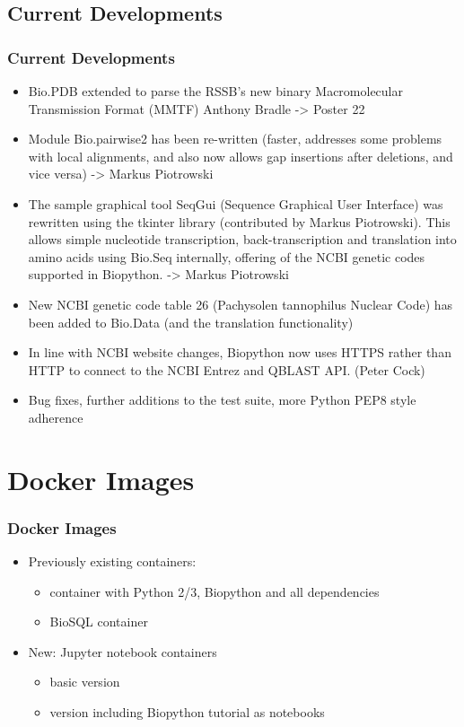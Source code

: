 \documentclass[trans]{beamer}
\begin{document}
\subsection*{Current Developments}
\frame
{
  \frametitle{Current Developments}

  \begin{itemize}
  \item Bio.PDB extended to parse the RSSB's new binary Macromolecular
Transmission Format (MMTF) Anthony Bradle -> Poster 22

  \item Module Bio.pairwise2 has been re-written (faster, addresses some problems with local alignments, and also now allows gap insertions after deletions, and vice versa) -> Markus Piotrowski

  \item The sample graphical tool SeqGui (Sequence Graphical User Interface) was
rewritten using the tkinter library (contributed by Markus Piotrowski). This
allows simple nucleotide transcription, back-transcription and translation
into amino acids using Bio.Seq internally, offering of the NCBI genetic codes
supported in Biopython. -> Markus Piotrowski

  \item New NCBI genetic code table 26 (Pachysolen tannophilus Nuclear Code) has been
added to Bio.Data (and the translation functionality)

  \item In line with NCBI website changes, Biopython now uses HTTPS rather than HTTP
to connect to the NCBI Entrez and QBLAST API. (Peter Cock)

  \item Bug fixes, further additions to the test suite, more Python PEP8 style adherence

  \end{itemize}
}


\section{Docker Images}
\frame
{
  \frametitle{Docker Images}

  \begin{itemize}
  \item Previously existing containers:
    \begin{itemize}
    \item container with Python 2/3, Biopython and all dependencies
    \item BioSQL container
  \end{itemize}
  \item New: Jupyter notebook containers
    \begin{itemize}
      \item basic version
      \item version including Biopython tutorial as notebooks
    \end{itemize}
  \end{itemize}
}
\end{document}
